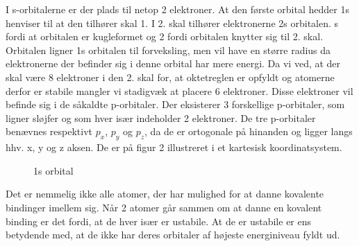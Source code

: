 \documentclass[12pt,a4paper]{article}
\theoremstyle{break}
\theoremstyle{nonumberplain}
\begin{document}
  I s-orbitalerne er der plads til netop 2 elektroner. At den første orbital hedder 1s henviser til at den tilhører skal 1. I 2. skal tilhører elektronerne 2s orbitalen. s fordi at orbitalen er kugleformet og 2 fordi orbitalen knytter sig til 2. skal. Orbitalen ligner 1s orbitalen til forveksling, men vil have en større radius da elektronerne der befinder sig i denne orbital har mere energi. Da vi ved, at der skal være 8 elektroner i den 2. skal for, at oktetreglen er opfyldt og atomerne derfor er stabile mangler vi stadigvæk at placere 6 elektroner. Disse elektroner vil befinde sig i de såkaldte p-orbitaler. Der eksisterer 3 forskellige p-orbitaler, som ligner sløjfer og som hver især indeholder 2 elektroner. De tre p-orbitaler benævnes respektivt $p_x$, $p_y$ og $p_z$, da de er ortogonale på hinanden og ligger langs hhv. x, y og z aksen. De er på figur 2 illustreret i et kartesisk koordinatsystem.
  
 
\begin{figure}[ht!]
  \centering
  \caption{1s orbital} \end{figure}


Det er nemmelig ikke alle atomer, der har mulighed for at danne kovalente bindinger imellem sig. Når 2 atomer går sammen om at danne en kovalent binding er det fordi, at de hver især er ustabile. At de er ustabile er ens betydende med, at de ikke har deres orbitaler af højeste energiniveau fyldt ud. 
\end{document}
